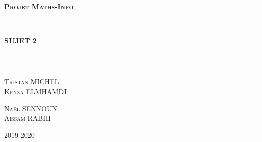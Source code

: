 \documentclass{article}
\newcommand{\HRule}{\rule{\linewidth}{0.5mm}}
\begin{document}

\begin{titlepage}
    \begin{sffamily}
        \begin{center}
        
            \textsc{\bfseries \huge Projet Maths-Info }\\[1.5cm]
            \HRule \\[0.4cm]
            { \huge \bfseries SUJET 2\\[0.4cm] }
            \HRule \\[2cm]
        
            \begin{minipage}{0.4\textwidth}
                \begin{flushleft} \large
                    \textsc{Tristan MICHEL\\ Kenza ELMHAMDI}
                \end{flushleft}
            \end{minipage}
            \begin{minipage}{0.4\textwidth}
                \begin{flushright} \large
                    \textsc{Naël SENNOUN\\Aissam RABHI}
                \end{flushright}
            \end{minipage}
            \vfill
        
            {\large 2019-2020}
            
        \end{center}
    \end{sffamily}
\end{titlepage}


\tableofcontents
\newpage
\end{document}

